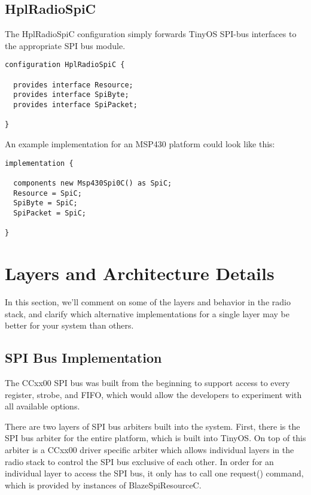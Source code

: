\documentclass{article}
\begin{document}
\subsection{HplRadioSpiC}
The HplRadioSpiC configuration simply forwards TinyOS SPI-bus interfaces to the 
appropriate SPI bus module.

\begin{verbatim}
configuration HplRadioSpiC {
  
  provides interface Resource;
  provides interface SpiByte;
  provides interface SpiPacket;
  
}
\end{verbatim}

An example implementation for an MSP430 platform could look like this:

\begin{verbatim}
implementation {

  components new Msp430Spi0C() as SpiC;
  Resource = SpiC;
  SpiByte = SpiC;
  SpiPacket = SpiC;

}
\end{verbatim}




\section{Layers and Architecture Details}
\label{sec:layersandarchitecturedetails}
In this section, we'll comment on some of the layers and behavior in the radio stack,
and clarify which alternative implementations for a single layer may be better for your
system than others.

\subsection{SPI Bus Implementation}
\label{sec:spibus}
The CCxx00 SPI bus was built from the beginning to support access to every register,
strobe, and FIFO, which would allow the developers to experiment with all available 
options.

There are two layers of SPI bus arbiters built into the system. First, there is
the SPI bus arbiter for the entire platform, which is built into TinyOS. On top of 
this arbiter is a CCxx00 driver specific arbiter which allows individual layers 
in the radio stack to control the SPI bus exclusive of each other.
In order for an individual layer to access the SPI bus, it only has to call one 
request() command, which is provided by instances of BlazeSpiResourceC. 
\end{document}
